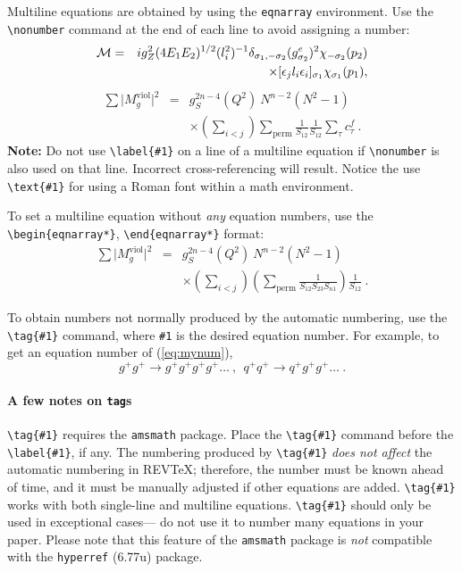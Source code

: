\documentclass[%
 reprint,
 amsmath,amssymb,
 aps,
]{revtex4-2}
\begin{document}
  Multiline equations are obtained by using the \verb+eqnarray+
  environment.  Use the \verb+\nonumber+ command at the end of each line
  to avoid assigning a number:
  \begin{eqnarray}
  {\cal M}=&&ig_Z^2(4E_1E_2)^{1/2}(l_i^2)^{-1}
  \delta_{\sigma_1,-\sigma_2}
  (g_{\sigma_2}^e)^2\chi_{-\sigma_2}(p_2)\nonumber\\
  &&\times
  [\epsilon_jl_i\epsilon_i]_{\sigma_1}\chi_{\sigma_1}(p_1),
  \end{eqnarray}
  \begin{eqnarray}
  \sum \vert M^{\text{viol}}_g \vert ^2&=&g^{2n-4}_S(Q^2)~N^{n-2}
          (N^2-1)\nonumber \\
  & &\times \left( \sum_{i<j}\right)
    \sum_{\text{perm}}
  \frac{1}{S_{12}}
  \frac{1}{S_{12}}
  \sum_\tau c^f_\tau~.
  \end{eqnarray}
  \textbf{Note:} Do not use \verb+\label{#1}+ on a line of a multiline
  equation if \verb+\nonumber+ is also used on that line. Incorrect
  cross-referencing will result. Notice the use \verb+\text{#1}+ for
  using a Roman font within a math environment.

  To set a multiline equation without \emph{any} equation
  numbers, use the \verb+\begin{eqnarray*}+,
  \verb+\end{eqnarray*}+ format:
  \begin{eqnarray*}
  \sum \vert M^{\text{viol}}_g \vert ^2&=&g^{2n-4}_S(Q^2)~N^{n-2}
          (N^2-1)\\
  & &\times \left( \sum_{i<j}\right)
  \left(
    \sum_{\text{perm}}\frac{1}{S_{12}S_{23}S_{n1}}
  \right)
  \frac{1}{S_{12}}~.
  \end{eqnarray*}

  To obtain numbers not normally produced by the automatic numbering,
  use the \verb+\tag{#1}+ command, where \verb+#1+ is the desired
  equation number. For example, to get an equation number of
  (\ref{eq:mynum}),
  \begin{equation}
  g^+g^+ \rightarrow g^+g^+g^+g^+ \dots ~,~~q^+q^+\rightarrow
  q^+g^+g^+ \dots ~. \tag{2.6$'$}\label{eq:mynum}
  \end{equation}

  \paragraph{A few notes on \texttt{tag}s} 
  \verb+\tag{#1}+ requires the \texttt{amsmath} package. 
  Place the \verb+\tag{#1}+ command before the \verb+\label{#1}+, if any. 
  The numbering produced by \verb+\tag{#1}+ \textit{does not affect} 
  the automatic numbering in REV\TeX; 
  therefore, the number must be known ahead of time, 
  and it must be manually adjusted if other equations are added. 
  \verb+\tag{#1}+ works with both single-line and multiline equations. 
  \verb+\tag{#1}+ should only be used in exceptional cases---%
  do not use it to number many equations in your paper. 
  Please note that this feature of the \texttt{amsmath} package
  is \emph{not} compatible with the \texttt{hyperref} (6.77u) package.
\end{document}
